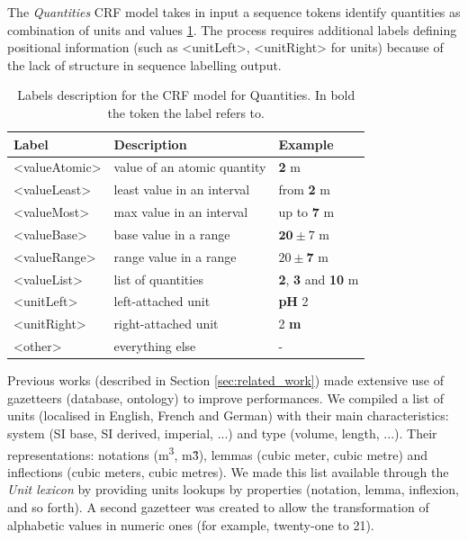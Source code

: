 \documentclass[sigconf]{acmart}
\begin{document}
The \textit{Quantities} CRF model takes in input a sequence tokens identify quantities as combination of units and values \ref{tab:quantities-model-labels}. The process requires additional labels defining positional information (such as <unitLeft>, <unitRight> for units) because of the lack of structure in sequence labelling output. 

\begin{table}[ht]
  \caption{Labels description for the CRF model for Quantities. In bold the token the label refers to.}
  \label{tab:quantities-model-labels}
  \begin{tabular}{lll}
    \toprule
    Label & Description & Example\\
    \midrule
    <valueAtomic> & value of an atomic quantity & \textbf{2} m \\
    <valueLeast> & least value in an interval & from \textbf{2} m \\
    <valueMost> & max value in an interval & up to \textbf{7} m \\
    <valueBase> & base value in a range & $\textbf{20}\pm7$ m \\
    <valueRange> & range value in a range & $20 \pm \textbf{7}$ m \\
    <valueList> & list of quantities & \textbf{2}, \textbf{3} and \textbf{10} m \\
    <unitLeft> & left-attached unit & \textbf{pH} 2 \\
    <unitRight> & right-attached unit & 2 \textbf{m} \\
    <other> & everything else & - \\
  \bottomrule
\end{tabular}
\end{table}

Previous works (described in Section \ref{sec:related_work}) made extensive use of gazetteers (database, ontology) to improve performances. We compiled a list of units (localised in English, French and German) with their main characteristics: system (SI base, SI derived, imperial, ...) and type (volume, length, ...). Their representations: notations (m\textsuperscript{3}, m\^3), lemmas (cubic meter, cubic metre) and inflections (cubic meters, cubic metres).  We made this list available through the \textit{Unit lexicon} by providing units lookups by properties (notation, lemma, inflexion, and so forth). A second gazetteer was created to allow the transformation of alphabetic values in numeric ones (for example, twenty-one to 21).
\end{document}
